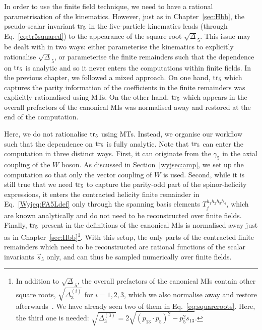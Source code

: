 \documentclass[main.tex]{subfiles}
\begin{document}
In order to use the finite field technique, we need to have a rational parametrisation of the kinematics. However, just as in Chapter~\ref{sec:Hbb}, the pseudo-scalar invariant $\operatorname{\rm tr}_5$ in the five-particle kinematics leads (through Eq.~\ref{eq:tr5squared}) to the appearance of the square root $\sqrt{\Delta}_5$. This issue may be dealt with in two ways: either parameterise the kinematics to explicitly rationalise $\sqrt{\Delta}_5$, or parameterise the finite remainders such that the dependence on $\operatorname{\rm tr}_5$ is analytic and so it never enters the computations within finite fields. In the previous chapter, we followed a mixed approach. On one hand, $\operatorname{\rm tr}_5$ which captures the parity information of the coefficients in the finite remainders was explicitly rationalised using MTs. On the other hand, $\operatorname{\rm tr}_5$ which appears in the overall prefactors of the canonical MIs was normalised away and restored at the end of the computation.

Here, we do not rationalise $\operatorname{\rm tr}_5$ using MTs. Instead, we organise our workflow such that the dependence on $\operatorname{\rm tr}_5$ is fully analytic. Note that $\operatorname{\rm tr}_5$ can enter the computation in three distinct ways. First, it can originate from the $\gamma_5$ in the axial coupling of the $W$ boson. As discussed in Section~\ref{wyjsec:amp}, we set up the computation so that only the vector coupling of $W$ is used. Second, while it is still true that we need $\operatorname{\rm tr}_5$ to capture the parity-odd part of the spinor-helicity expressions, it enters the contracted helicity finite remainder in Eq.~\ref{Wyjeq:FA5Ldef} only through the spanning basis elements $T_{j}^{h_1 h_2 h_3 h_4}$, which are known analytically and do not need to be reconstructed over finite fields. Finally, $\operatorname{\rm tr}_5$ present in the definitions of the canonical MIs is normalised away just as in Chapter~\ref{sec:Hbb}\footnote{In addition to $\sqrt{\Delta}_5$, the overall prefactors of the canonical MIs contain other square roots, $\sqrt{\Delta_3^{(i)}}$ for $i=1,2,3$, which we also normalise away and restore afterwards~\cite{Abreu:2020jxa, Chicherin:2021dyp}. We have already seen two of them in Eq.~\ref{eq:squareroots}. Here, the third one is needed: $\sqrt{\Delta_3^{(3)}} = 2 \sqrt{(p_{13} \cdot p_{5})^2 - p_5^2 s_{13}}$.}. With this setup, the only parts of the contracted finite remainders which need to be reconstructed are rational functions of the scalar invariants $\vec{s}_5$ only, and can thus be sampled numerically over finite fields.
\end{document}
